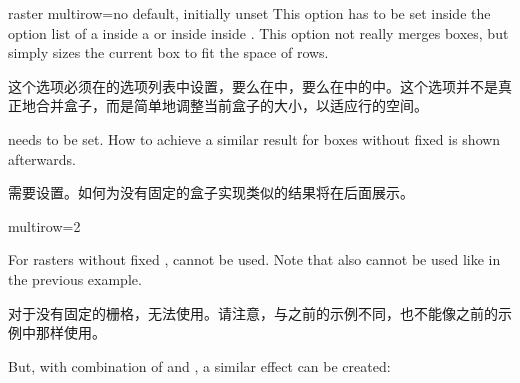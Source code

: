 \begin{docTcbKey}[][doc new=2016-02-19]{raster multirow}{=}{no default, initially unset}
This option has to be set inside the option list of a 
inside a  or inside  inside .
This option not really merges boxes, but simply sizes the current box to fit
the space of  rows.

这个选项必须在的选项列表中设置，要么在中，要么在中的中。这个选项并不是真正地合并盒子，而是简单地调整当前盒子的大小，以适应行的空间。
\begin{marker}
 needs  to be set.
How to achieve a similar result for boxes without fixed 
is shown afterwards.

需要设置。如何为没有固定的盒子实现类似的结果将在后面展示。
\end{marker}

\begin{dispExample}
\begin{tcbitemize}[raster rows=3,raster columns=3,raster height=6cm,
raster every box/.style={colframe=red!50!black,colback=red!10!white}]
\tcbitem
\tcbitem
\tcbitem
\tcbitem[colframe=blue!50!black,colback=blue!10!white,raster multirow=2]
multirow=2
\tcbitem[raster multicolumn=2,raster multirow=2,blankest]
\begin{tcbitemize}[raster rows=2,raster columns=2,raster height=\tcbtextheight]
\tcbitem
\tcbitem
\tcbitem
\tcbitem
\end{tcbitemize}
\end{tcbitemize}
\end{dispExample}



For rasters without fixed , 
cannot be used. Note that  also cannot be used like
in the previous example.

对于没有固定的栅格，无法使用。请注意，与之前的示例不同，也不能像之前的示例中那样使用。

But, with combination of  and
, a similar effect can be created:


\end{docTcbKey}

